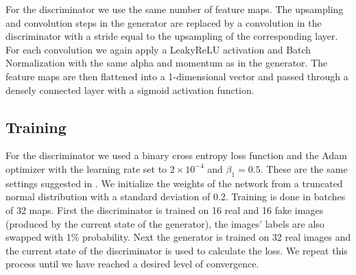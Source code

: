 \documentclass[twocolumn]{aastex62}
\begin{document}
For the discriminator we use the same number of feature maps. The upsampling and convolution steps in the generator are replaced by a convolution in the discriminator with a stride equal to the upsampling of the corresponding layer. For each convolution we again apply a LeakyReLU activation and Batch Normalization with the same alpha and momentum as in the generator. The feature maps are then flattened into a 1-dimensional vector and passed through a densely connected layer with a sigmoid activation function.

\subsection{Training}
For the discriminator we used a binary cross entropy loss function and the Adam optimizer with the learning rate set to $2\times10^{-4}$ and $\beta_1=0.5$. These are the same settings suggested in \cite{radford15}. We initialize the weights of the network from a truncated normal distribution with a standard deviation of 0.2. Training is done in batches of 32 maps. First the discriminator is trained on 16 real and 16 fake images (produced by the current state of the generator), the images' labels are also swapped with 1\% probability. Next the generator is trained on 32 real images and the current state of the discriminator is used to calculate the loss. We repeat this process until we have reached a desired level of convergence.
\end{document}
